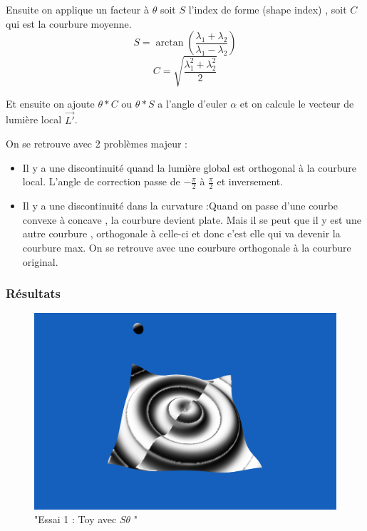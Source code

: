 \documentclass[a4paper]{article}
\begin{document}
Ensuite on applique un facteur à $\theta$   soit $S$ l'index de forme (shape index) , soit $C$ qui est la courbure moyenne. 
\[ S = \arctan\left(\frac{\lambda_1 + \lambda_2}{\lambda_1 - \lambda_2}\right)\]
\[ C = \sqrt{\frac{\lambda_1^2 + \lambda_2^2}{2}}\]

Et ensuite on ajoute $\theta * C$ ou $\theta * S$ a l'angle d'euler $\alpha$ et on calcule le vecteur de lumière local $\vec{L'}$.


On se retrouve avec 2 problèmes majeur : 
\begin{itemize}
\item Il y a une discontinuité quand la lumière global est orthogonal à la courbure local. L'angle de correction passe de $-\frac{\pi}{2}$ à $\frac{\pi}{2}$ et inversement. 
\item Il y a une discontinuité dans la curvature  :Quand on passe d'une courbe convexe à concave , la courbure devient plate. Mais il se peut que il y est une autre courbure , orthogonale à celle-ci et donc c'est elle qui va devenir la courbure max. On se retrouve avec une courbure orthogonale à la courbure original.
\end{itemize}



\subsubsection{Résultats}


\begin{figure}[thb]
	\centering
    \includegraphics[scale=0.3]{Images/Essais/Essai_1_s_toy.png}
    \caption{"Essai 1 : Toy avec $S\theta$ "}
 \end{figure}
\end{document}
